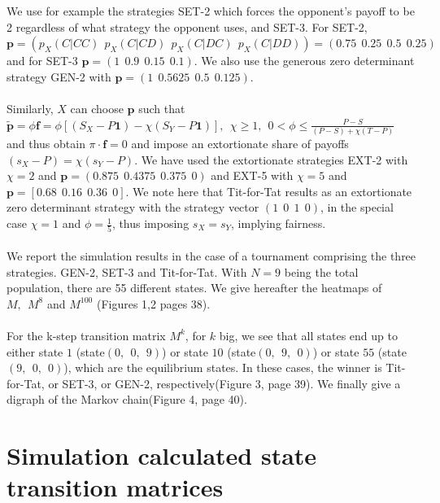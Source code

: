 \documentclass[12pt]{article}
\begin{document}
\\\\
We use for example the strategies SET-2 which forces the opponent's payoff to be 2 regardless of what strategy the opponent uses, and SET-3. For SET-2, \\ $\mathbf{p}=(p_X(C|CC)\ \ p_X(C|CD)\ \ p_X(C|DC)\ \ p_X(C|DD))=(0.75\ \ 0.25\ \ 0.5\ \ 0.25)$ and for SET-3 $\mathbf{p}=(1\ \ 0.9\ \ 0.15 \ \ 0.1)$. We also use the generous zero determinant strategy GEN-2 with $\mathbf{p}=(1\ \ 0.5625\ \ 0.5\ \ 0.125)$.
\\\\
Similarly, $X$ can choose $\mathbf{p}$ such that $\tilde{\mathbf{p}}=\phi \mathbf{f}=\phi[(S_X-P\mathbf{1})-\chi(S_Y-P\mathbf{1})],\ \ \chi\ge1,\ \ 0< \phi\le \frac{P-S}{(P-S)+\chi(T-P)}$ and thus obtain $\pi \cdot \mathbf{f}=0$ and impose an extortionate share of payoffs $(s_X-P)=\chi(s_Y-P)$. We have used the extortionate strategies EXT-2 with $\chi=2$ and $\mathbf{p}=(0.875\ \ 0.4375\ \ 0.375 \ \ 0)$ and EXT-5 with $\chi=5$ and $\mathbf{p}=[0.68 \ \ 0.16\ \ 0.36\ \ 0]$. We note here that Tit-for-Tat results as an extortionate zero determinant strategy with the strategy vector $(1\ \ 0\ \ 1\ \ 0)$, in the special case $\chi=1$ and $\phi=\frac{1}{5}$, thus imposing $s_X=s_Y$, implying fairness.
\\\\
We report the simulation results in the case of a tournament comprising the three strategies. GEN-2, SET-3 and Tit-for-Tat. With $N=9$ being the total population, there are 55 different states. We give hereafter the heatmaps of $M,\ \ M^8$ and $M^{100}$ (Figures 1,2 pages 38).
\\\\
For the k-step transition matrix $M^k$, for $k$ big, we see that all states end up to either state $1$ (state$(0,\ \ 0,\ \ 9)$) or state $10$ (state$(0,\ \ 9,\ \ 0)$) or state $55$ (state$(9,\ \ 0,\ \ 0)$), which are the equilibrium states. In these cases, the winner is Tit-for-Tat, or SET-3, or GEN-2, respectively(Figure 3, page 39). We finally give a digraph of the Markov chain(Figure 4, page 40).

\section{Simulation calculated state transition matrices}
\end{document}

